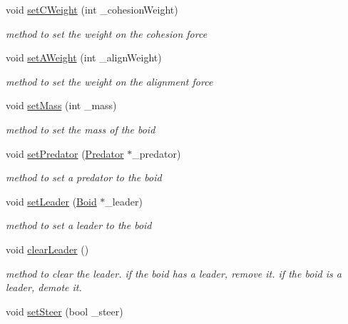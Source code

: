 \begin{DoxyCompactItemize}
void \hyperlink{classBoid_aa2ace7fb25c823079ebdab97dfefdf28}{setCWeight} (int \_\-cohesionWeight)
\begin{DoxyCompactList}\small\item\em method to set the weight on the cohesion force \item\end{DoxyCompactList}\item 
void \hyperlink{classBoid_acc3767ea7aaff905b618aab1dcb8d2e3}{setAWeight} (int \_\-alignWeight)
\begin{DoxyCompactList}\small\item\em method to set the weight on the alignment force \item\end{DoxyCompactList}\item 
void \hyperlink{classBoid_af9cc5ca3786b7a0c5fa7c6b61d257bde}{setMass} (int \_\-mass)
\begin{DoxyCompactList}\small\item\em method to set the mass of the boid \item\end{DoxyCompactList}\item 
void \hyperlink{classBoid_a89ab1705165acc63295f63acd59fd79b}{setPredator} (\hyperlink{classPredator}{Predator} $\ast$\_\-predator)
\begin{DoxyCompactList}\small\item\em method to set a predator to the boid \item\end{DoxyCompactList}\item 
void \hyperlink{classBoid_ab850962513064089effde9640a90eda5}{setLeader} (\hyperlink{classBoid}{Boid} $\ast$\_\-leader)
\begin{DoxyCompactList}\small\item\em method to set a leader to the boid \item\end{DoxyCompactList}\item 
void \hyperlink{classBoid_a633ee5a5c4ed56ab42f003440bca2771}{clearLeader} ()
\begin{DoxyCompactList}\small\item\em method to clear the leader. if the boid has a leader, remove it. if the boid is a leader, demote it. \item\end{DoxyCompactList}\item 
void \hyperlink{classBoid_a8196c708a9fc60aeb29bfc4134253cd2}{setSteer} (bool \_\-steer)

\end{DoxyCompactItemize}
